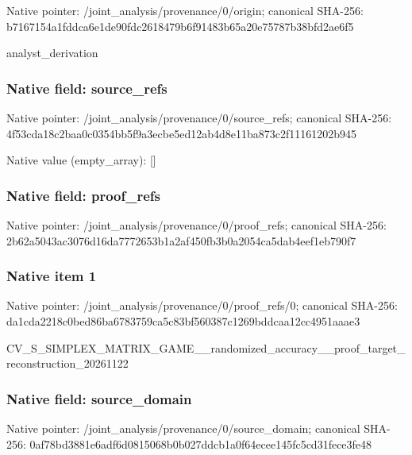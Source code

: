 \documentclass[10pt,a4paper]{article}
\begin{document}
Native pointer: /joint\_analysis/provenance/0/origin; canonical SHA-256: b7167154a1fddca6e1de90fd\allowbreak{}c2618479b6f91483b65a20e7\allowbreak{}5787b38bfd2ae6f5


analyst\_derivation


\subsubsection{Native field: source\_refs}


Native pointer: /joint\_analysis/provenan\allowbreak{}ce/0/source\_refs; canonical SHA-256: 4f53cda18c2baa0c0354bb5f\allowbreak{}9a3ecbe5ed12ab4d8e11ba87\allowbreak{}3c2f11161202b945



Native value (empty\_array): []



\subsubsection{Native field: proof\_refs}


Native pointer: /joint\_analysis/provenance/0/proof\_refs; canonical SHA-256: 2b62a5043ac3076d16da7772\allowbreak{}653b1a2af450fb3b0a2054ca\allowbreak{}5dab4eef1eb790f7



\subsubsection{Native item 1}


Native pointer: /joint\_analysis/provenan\allowbreak{}ce/0/proof\_refs/0; canonical SHA-256: da1cda2218c0bed86ba67837\allowbreak{}59ca5c83bf560387c1269bdd\allowbreak{}caa12cc4951aaae3


CV\_S\_SIMPLEX\_MATRIX\_GAME\allowbreak{}\_\_randomized\_accuracy\_\_p\allowbreak{}roof\_target\_reconstructi\allowbreak{}on\_20261122


\subsubsection{Native field: source\_domain}


Native pointer: /joint\_analysis/provenan\allowbreak{}ce/0/source\_domain; canonical SHA-256: 0af78bd3881e6adf6d081506\allowbreak{}8b0b027ddcb1a0f64ecee145\allowbreak{}fc5cd31fece3fe48
\end{document}
